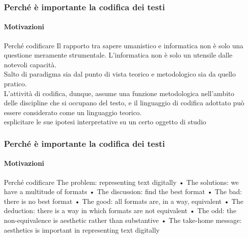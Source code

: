 \begin{frame}
    \frametitle{Perché è importante la codifica dei testi}
    \framesubtitle{Motivazioni}
    \addtocounter{nframe}{1}
    
    \begin{block}{Perché codificare}
    Il rapporto tra sapere umanistico e informatica non è solo una questione meramente strumentale. L'informatica non è solo un utensile dalle notevoli capacità.
    \\ Salto di paradigma sia dal punto di vista teorico e metodologico sia da quello pratico.
    \\ L’attività di codifica, dunque, assume una funzione metodologica nell’ambito delle discipline che si occupano del testo, e il linguaggio di codifica adottato può essere considerato come un linguaggio teorico.
    \\ esplicitare le sue ipotesi interpretative su un certo oggetto di studio
    \end{block}


\end{frame}

\begin{frame}
    \frametitle{Perché è importante la codifica dei testi}
    \framesubtitle{Motivazioni}
    \addtocounter{nframe}{1}
    
    \begin{block}{Perché codificare}
    The problem: representing text digitally
• The solutions: we have a multitude of formats
• The discussion: find the best format
• The bad: there is no best format
• The good: all formats are, in a way, equivalent
• The deduction: there is a way in which formats
are not equivalent
• The odd: the non-equivalence is aesthetic rather
than substantive
• The take-home message: aesthetics is
important in representing text digitally 
    \end{block}

    

\end{frame}

